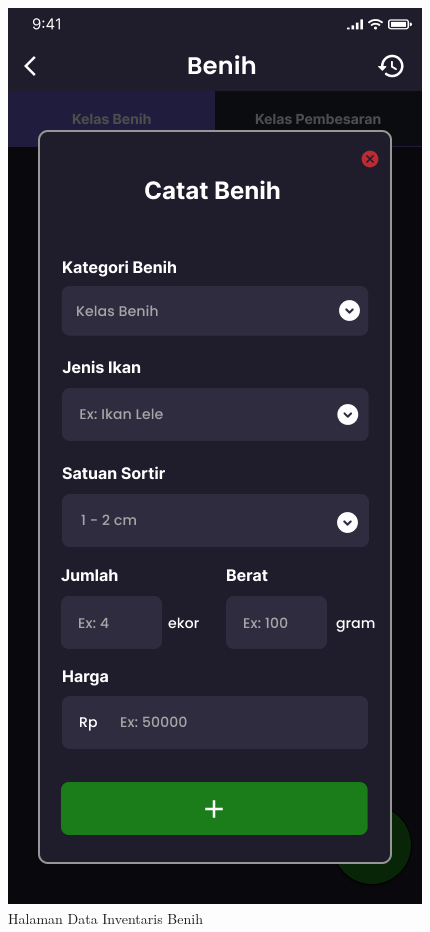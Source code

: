\begin{spacing}{1.5}
\begin{figure}[H]
			\caption{Halaman Data Inventaris Benih}
		\endminipage\hfill
			\includegraphics[width=\linewidth]{gambar/sprint1/mockup_input_seed.png}

\end{figure}
\end{spacing}
